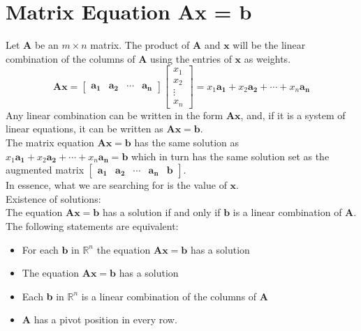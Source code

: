 \documentclass[nobib]{tufte-handout}
\begin{document}
\section{Matrix Equation \textbf{Ax} = \textbf{b}}
Let $\mathbf{A}$ be an $m\times n$ matrix. The product of $\mathbf{A}$ and $\mathbf{x}$ will be the linear combination of the columns of $\mathbf{A}$ using the entries of $\mathbf{x}$ as weights.
\begin{equation*}
    \mathbf{A}\mathbf{x} =
    \begin{bmatrix}
        \mathbf{a_1} & \mathbf{a_2} & \cdots & \mathbf{a_n}
    \end{bmatrix}
    \begin{bmatrix}
        x_1    \\
        x_2    \\
        \vdots \\
        x_n
    \end{bmatrix} =
    x_1\mathbf{a_1}+x_2\mathbf{a_2}+\cdots+ x_n\mathbf{a_n}
\end{equation*}
Any linear combination can be written in the form $\mathbf{A}\mathbf{x}$, and, if it is a system of linear equations, it can be written as $\mathbf{A}\mathbf{x}=\mathbf{b}$.\\
The matrix equation $\mathbf{A}\mathbf{x}=\mathbf{b}$ has the same solution as $x_1\mathbf{a_1}+x_2\mathbf{a_2}+\cdots+ x_n\mathbf{a_n} = \mathbf{b}$ which in turn has the same solution set as the augmented matrix $\begin{bmatrix}\mathbf{a_1} & \mathbf{a_2} & \cdots & \mathbf{a_n} & \mathbf{b}\end{bmatrix}$.\\
In essence, what we are searching for is the value of $\mathbf{x}$.\\
Existence of solutions:\\
The equation $\mathbf{A}\mathbf{x} =\mathbf{b}$ has a solution if and only if
$\mathbf{b}$ is a linear combination of $\mathbf{A}$.\\ The following
statements are equivalent:
\begin{itemize}
    \item For each $\mathbf{b}$ in $\mathbb{R}^n$ the equation
          $\mathbf{A}\mathbf{x}=\mathbf{b}$ has a solution
    \item The equation $\mathbf{A}\mathbf{x}=\mathbf{b}$ has a solution
    \item Each \textbf{b} in $\mathbb{R}^n$ is a linear combination of the columns of
          $\mathbf{A}$
    \item $\mathbf{A}$ has a pivot position in every row.
\end{itemize}
\end{document}
